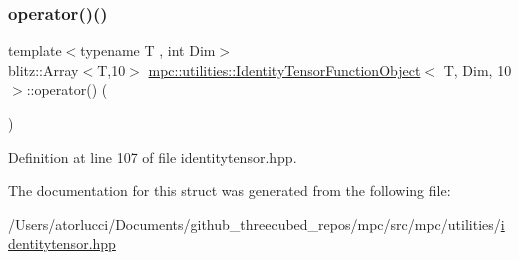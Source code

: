 \subsubsection{\texorpdfstring{operator()()}{operator()()}}
{\footnotesize\ttfamily template$<$typename T , int Dim$>$ \\
blitz\+::\+Array$<$T,10$>$ \mbox{\hyperlink{structmpc_1_1utilities_1_1_identity_tensor_function_object}{mpc\+::utilities\+::\+Identity\+Tensor\+Function\+Object}}$<$ T, Dim, 10 $>$\+::operator() (\begin{DoxyParamCaption}{ }\end{DoxyParamCaption})\hspace{0.3cm}{\ttfamily [inline]}}



Definition at line 107 of file identitytensor.\+hpp.



The documentation for this struct was generated from the following file\+:\begin{DoxyCompactItemize}
\item 
/\+Users/atorlucci/\+Documents/github\+\_\+threecubed\+\_\+repos/mpc/src/mpc/utilities/\mbox{\hyperlink{identitytensor_8hpp}{identitytensor.\+hpp}}\end{DoxyCompactItemize}
